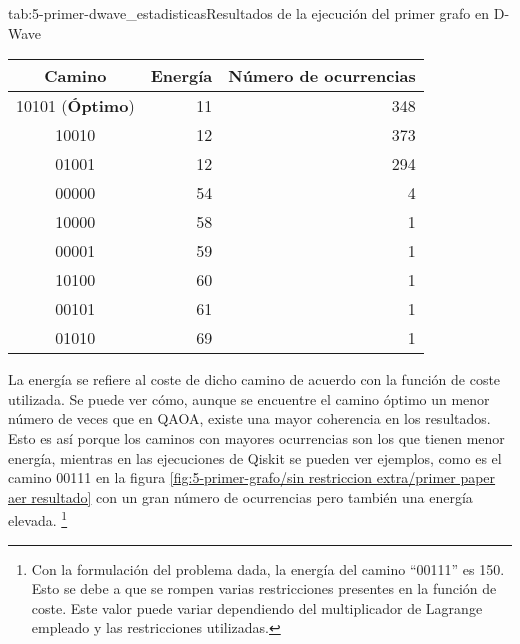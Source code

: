 \begin{table}[htbp]{tab:5-primer-dwave_estadisticas}{Resultados de la ejecución del primer grafo en D-Wave}
  \centering
  \begin{tabular}{|c|r|r|}
    \hline
    \textbf{Camino}         & \textbf{Energía} & \textbf{Número de ocurrencias} \\ \hline
    10101 (\textbf{Óptimo}) & 11               & 348                            \\ \hline
    10010                   & 12               & 373                            \\ \hline
    01001                   & 12               & 294                            \\ \hline
    00000                   & 54               &   4                            \\ \hline
    10000                   & 58               &   1                            \\ \hline
    00001                   & 59               &   1                            \\ \hline
    10100                   & 60               &   1                            \\ \hline
    00101                   & 61               &   1                            \\ \hline
    01010                   & 69               &   1                            \\ \hline
  \end{tabular}
\end{table}

La energía se refiere al coste de dicho camino de acuerdo con la función de coste utilizada. Se puede ver cómo, aunque se encuentre el camino óptimo un menor número de veces que en QAOA, existe una mayor coherencia en los resultados. Esto es así porque los caminos con mayores ocurrencias son los que tienen menor energía, mientras en las ejecuciones de Qiskit se pueden ver ejemplos, como es el camino 00111 en la figura \ref{fig:5-primer-grafo/sin restriccion extra/primer paper aer resultado} con un gran número de ocurrencias pero también una energía elevada.
\footnote{Con la formulación del problema dada, la energía del camino ``00111'' es 150. Esto se debe a que se rompen varias restricciones presentes en la función de coste. Este valor puede variar dependiendo del multiplicador de Lagrange empleado
  y las restricciones utilizadas.}


